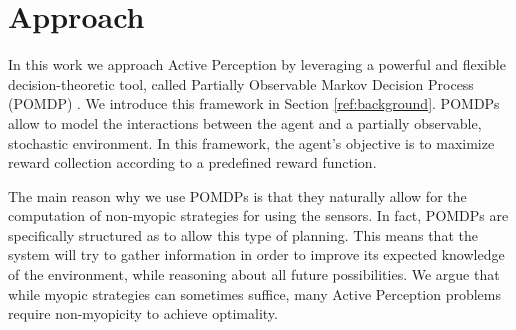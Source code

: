%
%

\section{Approach}

In this work we approach Active Perception by leveraging a powerful and flexible decision-theoretic
tool, called Partially Observable Markov Decision Process (POMDP) \cite{cit:pomdp}. We introduce
this framework in Section \ref{ref:background}. POMDPs allow to model the interactions between the
agent and a partially observable, stochastic environment.  In this framework, the agent's objective
is to maximize reward collection according to a predefined reward function.

The main reason why we use POMDPs is that they naturally allow for the computation of non-myopic
strategies for using the sensors. In fact, POMDPs are specifically structured as to allow this type
of planning. This means that the system will try to gather information in order to improve its
expected knowledge of the environment, while reasoning about all future possibilities. We argue that
while myopic strategies can sometimes suffice, many Active Perception problems require non-myopicity
to achieve optimality.


